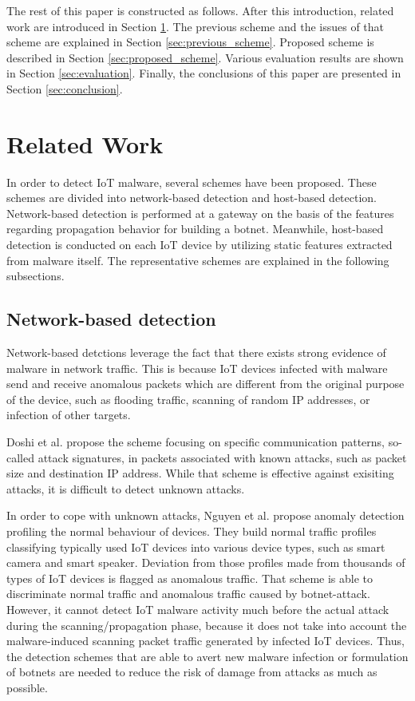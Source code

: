 \documentclass{ieeeaccess}
\begin{document}
The rest of this paper is constructed as follows. 
After this introduction, related work are introduced in Section \ref{sec:related_work}.
The previous scheme and the issues of that scheme are explained in Section \ref{sec:previous_scheme}.
Proposed scheme is described in Section \ref{sec:proposed_scheme}.
Various evaluation results are shown in Section \ref{sec:evaluation}.
Finally, the conclusions of this paper are presented in Section \ref{sec:conclusion}.


\section{Related Work} \label{sec:related_work}
In order to detect IoT malware, several schemes have been proposed.
These schemes are divided into network-based detection and host-based detection.
Network-based detection is performed at a gateway on the basis of the features regarding propagation behavior for building a botnet.
Meanwhile, host-based detection is conducted on each IoT device by utilizing static features extracted from malware itself.
The representative schemes are explained in the following subsections.

\subsection{Network-based detection}
Network-based detctions \cite{zako, diot, net} leverage the fact that there exists strong evidence of malware in network traffic.
This is because IoT devices infected with malware send and receive anomalous packets which are different from the original purpose of the device, such as flooding traffic, scanning of random IP addresses, or infection of other targets.

Doshi et al. \cite{zako} propose the scheme focusing on specific communication patterns, so-called attack signatures, in packets associated with known attacks, such as packet size and destination IP address.
While that scheme is effective against exisiting attacks, it is difficult to detect unknown attacks.

In order to cope with unknown attacks, Nguyen et al. \cite{diot} propose anomaly detection profiling the normal behaviour of devices.
They build normal traffic profiles classifying typically used IoT devices into various device types, such as smart camera and smart speaker.
Deviation from those profiles made from thousands of types of IoT devices is flagged as anomalous traffic.
That scheme is able to discriminate normal traffic and anomalous traffic caused by botnet-attack.
However, it cannot detect IoT malware activity much before the actual attack during the scanning/propagation phase, because it does not take into account the malware-induced scanning packet traffic generated by infected IoT devices.
Thus, the detection schemes that are able to avert new malware infection or formulation of botnets are needed to reduce the risk of damage from attacks as much as possible.
\end{document}
